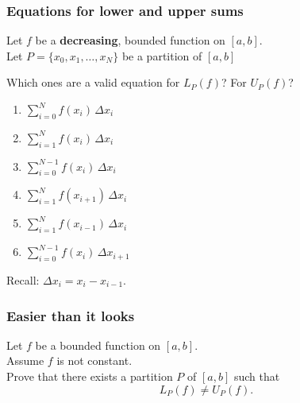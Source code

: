 \documentclass[14pt]{beamer}
\begin{document}
	\begin{frame}[t]
		\fontsize{13}{13}\selectfont
		\frametitle{Equations for lower and upper sums}

		Let $f$ be a {\bfseries decreasing}, bounded function on $[a,b]$. \\ Let $\displaystyle
		P = \{x_{0}, x_{1}, \ldots, x_{N}\}$ be a partition of $[a,b]$

		Which ones are a valid equation for $L_{P}(f)$? For $U_{P}(f)$?

		\begin{multicols}{3}
			\begin{enumerate}
				\item $\displaystyle \sum_{i=0}^{N}f(x_{i}) \, \Delta x_{i}$

				\item $\displaystyle \sum_{i = 1}^{N}f(x_{i}) \, \Delta x_{i}$

				\item $\displaystyle \sum_{i = 0}^{N-1}f(x_{i}) \, \Delta x_{i}$

				\item $\displaystyle \sum_{i = 1}^{N}f(x_{i+1}) \, \Delta x_{i}$

				\item $\displaystyle \sum_{i = 1}^{N}f(x_{i-1}) \, \Delta x_{i}$

				\item $\displaystyle \sum_{i = 0}^{N-1}f(x_{i}) \, \Delta x_{i+1}$
			\end{enumerate}
		\end{multicols}

		Recall: $\displaystyle \Delta x_{i}= x_{i}- x_{i-1}$.
	\end{frame}

	\begin{frame}[t]
		\frametitle{Easier than it looks}

		Let $f$ be a bounded function on $[a,b]$. \\ Assume $f$ is not constant. \\
		Prove that there exists a partition $P$ of $[a,b]$ such that
		\[
			L_{P}(f) \neq U_{P}(f).
		\]
	\end{frame}
\end{document}

